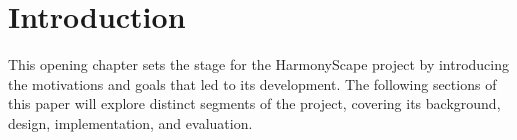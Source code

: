 \documentclass{l4proj}
\begin{document}
%
%
%
%
%
%
%
%
\chapter{Introduction}




This opening chapter sets the stage for the HarmonyScape project by introducing the motivations and goals that led to its development. The following sections of this paper will explore distinct segments of the project, covering its background, design, implementation, and evaluation.
\end{document}
